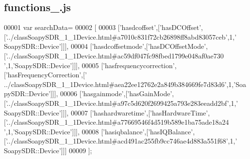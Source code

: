\subsection{functions\+\_.\+js}
\label{functions__6_8js_source}

\begin{DoxyCode}
00001 var searchData=
00002 [
00003   [\textcolor{stringliteral}{'hasdcoffset'},[\textcolor{stringliteral}{'hasDCOffset'},[\textcolor{stringliteral}{'../classSoapySDR\_1\_1Device.html#a7010c831f72cb26898ff8abd83057ceb'},1,\textcolor{stringliteral}{'
      SoapySDR::Device'}]]],
00004   [\textcolor{stringliteral}{'hasdcoffsetmode'},[\textcolor{stringliteral}{'hasDCOffsetMode'},[\textcolor{stringliteral}{'../classSoapySDR\_1\_1Device.html#ac59df047fc98fbed1799e048af0ae730
      '},1,\textcolor{stringliteral}{'SoapySDR::Device'}]]],
00005   [\textcolor{stringliteral}{'hasfrequencycorrection'},[\textcolor{stringliteral}{'hasFrequencyCorrection'},[\textcolor{stringliteral}{'
      ../classSoapySDR\_1\_1Device.html#aea22ee12762e2a849b384669fe7d83d6'},1,\textcolor{stringliteral}{'SoapySDR::Device'}]]],
00006   [\textcolor{stringliteral}{'hasgainmode'},[\textcolor{stringliteral}{'hasGainMode'},[\textcolor{stringliteral}{'../classSoapySDR\_1\_1Device.html#a97c5d620f2699425a793e283eeadd2bf'},1,\textcolor{stringliteral}{'
      SoapySDR::Device'}]]],
00007   [\textcolor{stringliteral}{'hashardwaretime'},[\textcolor{stringliteral}{'hasHardwareTime'},[\textcolor{stringliteral}{'../classSoapySDR\_1\_1Device.html#a77669546f4d519b589e1ba75ade18a24
      '},1,\textcolor{stringliteral}{'SoapySDR::Device'}]]],
00008   [\textcolor{stringliteral}{'hasiqbalance'},[\textcolor{stringliteral}{'hasIQBalance'},[\textcolor{stringliteral}{'../classSoapySDR\_1\_1Device.html#acd491ac255fb9cc746ae4d883a551f68'},1,\textcolor{stringliteral}{'
      SoapySDR::Device'}]]]
00009 ];
\end{DoxyCode}
